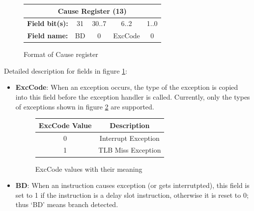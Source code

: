 \documentclass[oneside]{book}
\begin{document}
\begin{itemize}
\begin{figure}[H]
\begin{center}
\begin{tabular}{|c|c|c|c|c|}

\hline \multicolumn{5}{|c|}{Cause Register (13)} \\

\hline \textbf{Field bit(s):} & 31 & 30..7 & 6..2    & 1..0 \\

\hline \textbf{Field name:}   & BD & 0     & ExcCode & 0    \\

\hline

\end{tabular}

\end{center}
\caption{Format of Cause register}
\label{cause_reg}
\end{figure}

Detailed description for fields in figure \ref{cause_reg}:

\begin{itemize}

\item \textbf{ExcCode}: When an exception occurs, the type
      of the exception is copied into this field before
      the exception handler is called. Currently, only
      the types of exceptions shown in figure \ref{exccode}
      are supported.

      \begin{figure}[H]
      \begin{center}
      \begin{tabular}{|c|c|}
      \hline \textbf{ExcCode Value} & \textbf{Description} \\
      \hline 0                      & Interrupt Exception \\
      \hline 1                      & TLB Miss Exception \\
      \hline
      \end{tabular}
      \end{center}
      \caption{ExcCode values with their meaning}
      \label{exccode}
      \end{figure}

\item \textbf{BD}: When an instruction causes exception (or
      gets interrutpted), this field is set to 1 if the
      instruction is a delay slot instruction, otherwise
      it is reset to 0; thus `BD' means branch detected.


\end{itemize}
\end{itemize}
\end{document}
